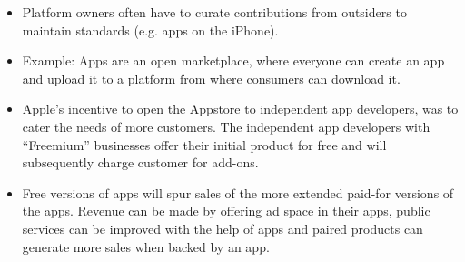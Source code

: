 \begin{itemize}
	\item Platform owners often have to curate contributions from outsiders to maintain standards (e.g. apps on the iPhone).
	\item Example: Apps are an open marketplace, where everyone can create an app and upload it to a platform from where consumers can download it.
	\item Apple’s incentive to open the Appstore to independent app developers, was to cater the needs of more customers. The independent app developers with “Freemium” businesses offer their initial product for free and will subsequently
	charge customer for add-ons.
	\item Free versions of apps will spur sales of the more extended paid-for versions of the apps. Revenue can be made by offering ad space in their apps, public services can be improved with the help of apps and paired products can generate more sales when backed by an app.
\end{itemize}